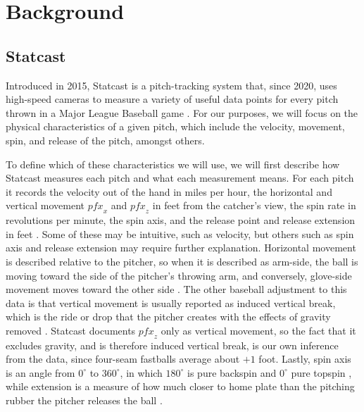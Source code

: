 \documentclass[11pt]{article}
\theoremstyle{definition}
\theoremstyle{remark}
\begin{document}
\section{Background}\label{sec:background}
\subsection{Statcast}\label{sec:statcast}
Introduced in 2015, Statcast is a pitch-tracking system that, since 2020, uses high-speed cameras to measure a variety of useful data points for every pitch thrown in a Major League Baseball game \parencite{mlbglossary_statcast}.
For our purposes, we will focus on the physical characteristics of a given pitch, which include the velocity, movement, spin, and release of the pitch, amongst others.

To define which of these characteristics we will use, we will first describe how Statcast measures each pitch and what each measurement means.
For each pitch it records the velocity out of the hand in miles per hour, the horizontal and vertical movement $\mathit{pfx}_x$ and $\mathit{pfx}_z$ in feet from the catcher's view, the spin rate in revolutions per minute, the spin axis, and the release point and release extension in feet \parencite{savantcsvdocs,mlbglossary_spinrate}.
Some of these may be intuitive, such as velocity, but others such as spin axis and release extension may require further explanation.
Horizontal movement is described relative to the pitcher, so when it is described as arm-side, the ball is moving toward the side of the pitcher's throwing arm, and conversely, glove-side movement moves toward the other side \parencite{savantcsvdocs,mlbglossary_slurve}.
The other baseball adjustment to this data is that vertical movement is usually reported as induced vertical break, which is the ride or drop that the pitcher creates with the effects of gravity removed \parencite{mlbglossary_ivb}.
Statcast documents $\mathit{pfx}_z$ only as vertical movement, so the fact that it excludes gravity, and is therefore induced vertical break, is our own inference from the data, since four-seam fastballs average about $+1$ foot.
Lastly, spin axis is an angle from $0^\circ$ to $360^\circ$, in which $180^\circ$ is pure backspin and $0^\circ$ pure topspin \parencite{savantcsvdocs}, while extension is a measure of how much closer to home plate than the pitching rubber the pitcher releases the ball \parencite{mlbglossary_extension}.
\end{document}

